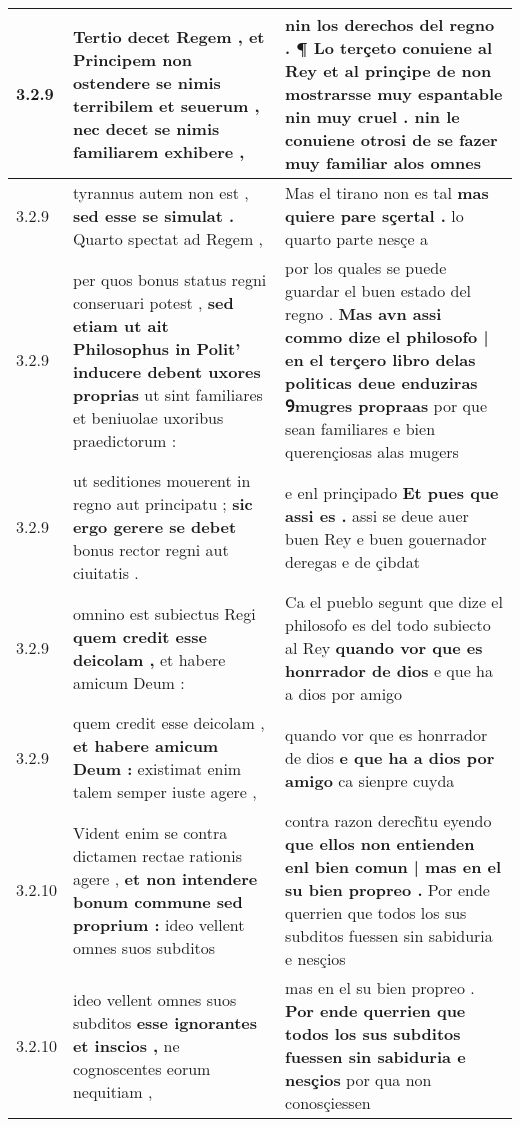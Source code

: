 \begin{tabular}{|p{1cm}|p{6.5cm}|p{6.5cm}|}
3.2.9 & Tertio decet Regem , \textbf{ et Principem non ostendere se nimis terribilem et seuerum , } nec decet se nimis familiarem exhibere , & nin los derechos del regno . \textbf{ ¶ Lo terçeto conuiene al Rey et al prinçipe de non mostrarsse muy espantable nin muy cruel . } nin le conuiene otrosi de se fazer muy familiar alos omnes \\\hline
3.2.9 & tyrannus autem non est , \textbf{ sed esse se simulat . } Quarto spectat ad Regem , & Mas el tirano non es tal \textbf{ mas quiere pare sçertal . } lo quarto parte nesçe a \\\hline
3.2.9 & per quos bonus status regni conseruari potest , \textbf{ sed etiam ut ait Philosophus in Polit’ inducere debent uxores proprias } ut sint familiares et beniuolae uxoribus praedictorum : & por los quales se puede guardar el buen estado del regno . \textbf{ Mas avn assi commo dize el philosofo | en el terçero libro delas politicas deue enduziras Ꝯmugres propraas } por que sean familiares e bien querençiosas alas mugers \\\hline
3.2.9 & ut seditiones mouerent in regno aut principatu ; \textbf{ sic ergo gerere se debet } bonus rector regni aut ciuitatis . & e enl prinçipado \textbf{ Et pues que assi es . } assi se deue auer buen Rey e buen gouernador deregas e de çibdat \\\hline
3.2.9 & omnino est subiectus Regi \textbf{ quem credit esse deicolam , } et habere amicum Deum : & Ca el pueblo segunt que dize el philosofo es del todo subiecto al Rey \textbf{ quando vor que es honrrador de dios } e que ha a dios por amigo \\\hline
3.2.9 & quem credit esse deicolam , \textbf{ et habere amicum Deum : } existimat enim talem semper iuste agere , & quando vor que es honrrador de dios \textbf{ e que ha a dios por amigo } ca sienpre cuyda \\\hline
3.2.10 & Vident enim se contra dictamen rectae rationis agere , \textbf{ et non intendere bonum commune sed proprium : } ideo vellent omnes suos subditos & contra razon derech̃tu eyendo \textbf{ que ellos non entienden enl bien comun | mas en el su bien propreo . } Por ende querrien que todos los sus subditos fuessen sin sabiduria e nesçios \\\hline
3.2.10 & ideo vellent omnes suos subditos \textbf{ esse ignorantes et inscios , } ne cognoscentes eorum nequitiam , & mas en el su bien propreo . \textbf{ Por ende querrien que todos los sus subditos fuessen sin sabiduria e nesçios } por qua non conosçiessen \\\hline

\end{tabular}
